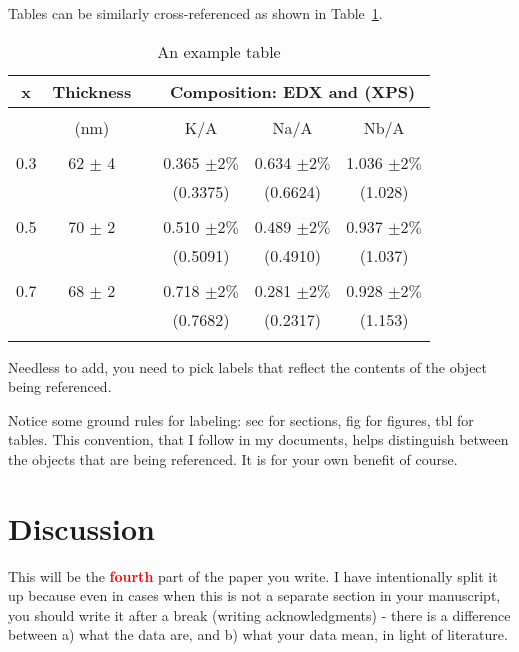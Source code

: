 \documentclass[12 pt]{article}
\begin{document}
Tables can be similarly cross-referenced as shown in Table~\ref{tbl:ratio}.

\begin{table}
  \caption{An example table}
  \label{tbl:ratio}
  \begin{center}
    \begin{tabular}{cccccc}
      x  & Thickness & & \multicolumn{3}{c}{Composition: EDX and (XPS)} \\
      \hline \\
         & (nm) & & K/A & Na/A & Nb/A \\
      \hline \\
      0.3 & 62 $\pm$ 4 & & 0.365 $\pm 2\%$ & 0.634 $\pm 2\%$ & 1.036 $\pm 2\%$ \\
         & & & (0.3375) & (0.6624) & (1.028) \\
      \hline \\
      0.5 & 70 $\pm$ 2 & & 0.510 $\pm 2\%$ & 0.489 $\pm 2\%$ & 0.937 $\pm 2\%$ \\
         & & & (0.5091) & (0.4910) & (1.037) \\
      \hline \\
      0.7 & 68 $\pm$ 2 & & 0.718 $\pm 2\%$ & 0.281 $\pm 2\%$ & 0.928 $\pm 2\%$ \\
         & & & (0.7682) & (0.2317) & (1.153) \\
      \hline \\
    \end{tabular}
  \end{center}
\end{table}

Needless to add, you need to pick labels that reflect the contents of the object being referenced.

Notice some ground rules for labeling: sec for sections, fig for figures, tbl for tables. This convention, that I follow in my documents, helps distinguish between the objects that are being referenced. It is for your own benefit of course.

\section{Discussion}
\label{sec:discussion}

This will be the \textbf{\Huge \textcolor{red}{fourth}} part of the paper you write. I have intentionally split it up because even in cases when this is not a separate section in your manuscript, you should write it after a break (writing acknowledgments) - there is a difference between a) what the data are, and b) what your data mean, in light of literature.
\end{document}
